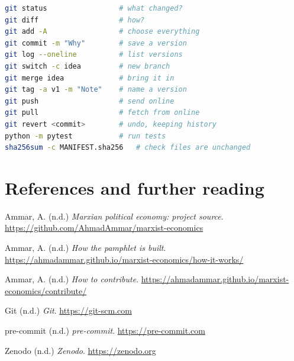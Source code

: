 \begin{lstlisting}[language=bash]
git status                 # what changed?
git diff                   # how?
git add -A                 # choose everything
git commit -m "Why"        # save a version
git log --oneline          # list versions
git switch -c idea         # new branch
git merge idea             # bring it in
git tag -a v1 -m "Note"    # name a version
git push                   # send online
git pull                   # fetch from online
git revert <commit>        # undo, keeping history
python -m pytest           # run tests
sha256sum -c MANIFEST.sha256   # check files are unchanged
\end{lstlisting}

\section{References and further reading}\label{references-and-further-reading}

Ammar, A. (n.d.) \emph{Marxian political economy: project source}. \url{https://github.com/AhmadAmmar/marxist-economics}

Ammar, A. (n.d.) \emph{How the pamphlet is built}. \url{https://ahmadammar.github.io/marxist-economics/how-it-works/}

Ammar, A. (n.d.) \emph{How to contribute}. \url{https://ahmadammar.github.io/marxist-economics/contribute/}

Git (n.d.) \emph{Git}. \url{https://git-scm.com}

pre-commit (n.d.) \emph{pre-commit}. \url{https://pre-commit.com}

Zenodo (n.d.) \emph{Zenodo}. \url{https://zenodo.org}

